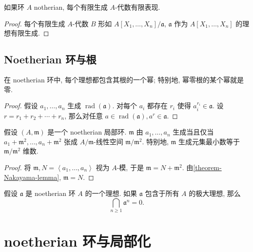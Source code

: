 \begin{corollary}
  如果环 \( A \) notherian, 每个有限生成 \( A \)-代数有限表现.
\end{corollary}
\begin{proof}
  每个有限生成 \( A \)-代数 \( B \) 形如 \( A[X_1, \ldots, X_n] / \mathfrak{a}
  \), \( \mathfrak{a} \) 作为 \( A[X_1, \ldots, X_n] \) 的理想有限生成.
\end{proof}

\subsection{Noetherian 环与根}

\begin{proposition}
  在 noetherian 环中, 每个理想都包含其根的一个幂; 特别地, 幂零根的某个幂就是零.
\end{proposition}
\begin{proof}
  假设 \( a_1, \ldots, a_n \) 生成 \( \operatorname{rad}(\mathfrak{a}) \).
  对每个 \( a_i \) 都存在 \( r_i \) 使得 \( a_i^{r_i} \in \mathfrak{a} \).
  设 \( r = r_1 + r_2 + \cdots + r_n \), 那么对任意 \( a \in
  \operatorname{rad}(\mathfrak{a}), a^r \in \mathfrak{a} \).
\end{proof}

\begin{proposition}
  假设 \( (A, \mathfrak{m}) \) 是一个 noetherian 局部环.
  \( \mathfrak{m} \) 由 \( a_1, \ldots, a_n \) 生成当且仅当
  \( a_1 + \mathfrak{m}^2,\ldots, a_n + \mathfrak{m}^{2} \) 张成 \( A /
  \mathfrak{m} \)-线性空间 \( \mathfrak{m} / \mathfrak{m}^2 \).
  特别地, \( \mathfrak{m} \) 生成元集最小数等于 \( \mathfrak{m} / \mathfrak{m}^2
  \) 维数.
\end{proposition}
\begin{proof}
  将 \(  \mathfrak{m}, N = \left\langle a_1, \ldots, a_n \right\rangle \) 视为
  \( A \)-模, 于是 \( \mathfrak{m} = N + \mathfrak{m}^2 \).
  由\cref{theorem-Nakayama-lemma}, \( \mathfrak{m} = N \).
\end{proof}

\begin{theorem}
  \label{theorem-Krull-intersection}
  假设 \( \mathfrak{a} \) 是 noetherian 环 \( A \) 的一个理想. 如果 \(
  \mathfrak{a} \) 包含于所有 \( A \) 的极大理想, 那么
  \[
    \bigcap_{n \geq 1} \mathfrak{a}^n = 0.
  \]
\end{theorem}

\section{noetherian 环与局部化}

